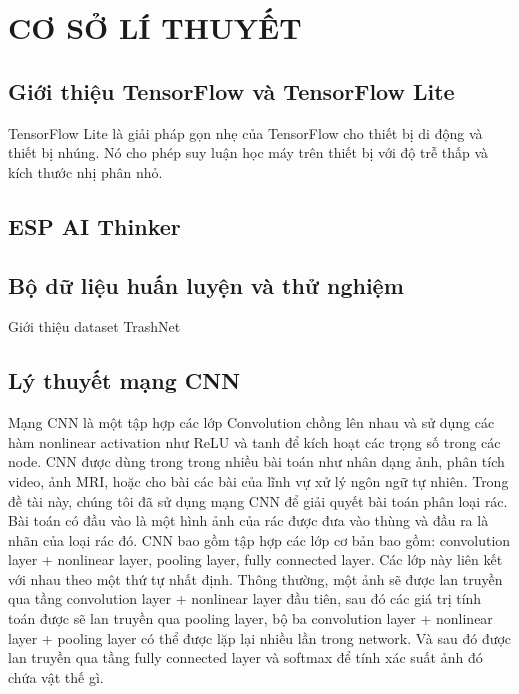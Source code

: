 
\chapter{CƠ SỞ LÍ THUYẾT}
\label{chap:ontology}
\section{Giới thiệu TensorFlow và TensorFlow Lite}
TensorFlow Lite là giải pháp gọn nhẹ của TensorFlow cho thiết bị di động và thiết bị nhúng.
Nó cho phép suy luận học máy trên thiết bị với độ trễ thấp và kích thước nhị phân nhỏ.

\section{ESP AI Thinker}

\section{Bộ dữ liệu huấn luyện và thử nghiệm}


Giới thiệu dataset TrashNet \cite{trashnet}


\section{Lý thuyết mạng CNN}
Mạng CNN là một tập hợp các lớp Convolution chồng lên nhau và sử dụng các hàm nonlinear activation như ReLU và tanh để kích hoạt các trọng số trong các node. CNN được dùng trong trong nhiều bài toán như nhân dạng ảnh, phân tích video, ảnh MRI, hoặc cho bài các bài của lĩnh vự xử lý ngôn ngữ tự nhiên. Trong đề tài này, chúng tôi đã sử dụng mạng CNN để giải quyết bài toán phân loại rác.
Bài toán có đầu vào là một hình ảnh của rác được đưa vào thùng và đầu ra là nhãn của loại rác đó.
CNN bao gồm tập hợp các lớp cơ bản bao gồm: convolution layer + nonlinear layer, pooling layer, fully connected layer. 
Các lớp này liên kết với nhau theo một thứ tự nhất định. 
Thông thường, một ảnh sẽ được lan truyền qua tầng convolution layer + nonlinear layer đầu tiên, sau đó các giá trị tính toán được sẽ lan truyền qua pooling layer, bộ ba convolution layer + nonlinear layer + pooling layer có thể được lặp lại nhiều lần trong network. Và sau đó được lan truyền qua tầng fully connected layer và softmax để tính xác suất ảnh đó chứa vật thế gì.

